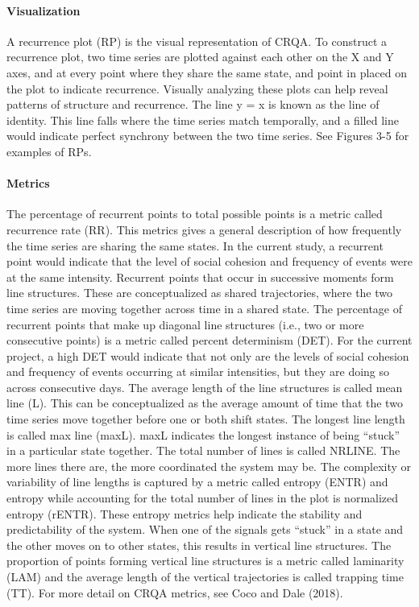 \documentclass[english,man]{apa6}
\begin{document}
\hypertarget{visualization}{%
\paragraph{Visualization}\label{visualization}}

A recurrence plot (RP) is the visual representation of CRQA. To construct a recurrence plot, two time series are plotted against each other on the X and Y axes, and at every point where they share the same state, and point in placed on the plot to indicate recurrence. Visually analyzing these plots can help reveal patterns of structure and recurrence. The line y = x is known as the line of identity. This line falls where the time series match temporally, and a filled line would indicate perfect synchrony between the two time series. See Figures 3-5 for examples of RPs.

\hypertarget{metrics}{%
\paragraph{Metrics}\label{metrics}}

The percentage of recurrent points to total possible points is a metric called recurrence rate (RR). This metrics gives a general description of how frequently the time series are sharing the same states. In the current study, a recurrent point would indicate that the level of social cohesion and frequency of events were at the same intensity.
Recurrent points that occur in successive moments form line structures. These are conceptualized as shared trajectories, where the two time series are moving together across time in a shared state. The percentage of recurrent points that make up diagonal line structures (i.e., two or more consecutive points) is a metric called percent determinism (DET). For the current project, a high DET would indicate that not only are the levels of social cohesion and frequency of events occurring at similar intensities, but they are doing so across consecutive days.
The average length of the line structures is called mean line (L). This can be conceptualized as the average amount of time that the two time series move together before one or both shift states. The longest line length is called max line (maxL). maxL indicates the longest instance of being \enquote{stuck} in a particular state together. The total number of lines is called NRLINE. The more lines there are, the more coordinated the system may be. The complexity or variability of line lengths is captured by a metric called entropy (ENTR) and entropy while accounting for the total number of lines in the plot is normalized entropy (rENTR). These entropy metrics help indicate the stability and predictability of the system. When one of the signals gets \enquote{stuck} in a state and the other moves on to other states, this results in vertical line structures. The proportion of points forming vertical line structures is a metric called laminarity (LAM) and the average length of the vertical trajectories is called trapping time (TT). For more detail on CRQA metrics, see Coco and Dale (2018).
\end{document}

